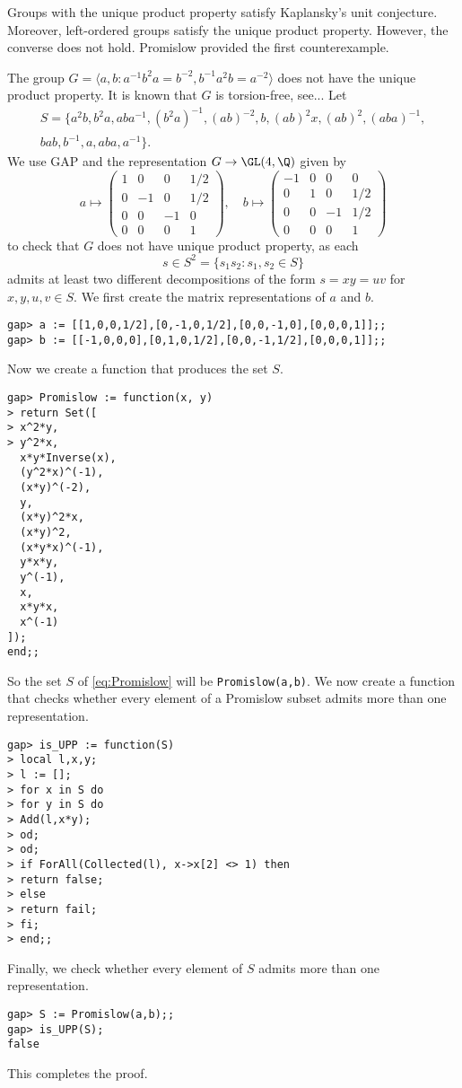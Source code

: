 Groups with the unique product property satisfy 
Kaplansky's unit conjecture. Moreover, 
left-ordered groups satisfy 
the unique product property. However, the converse
does not hold. Promislow provided the first counterexample.

\begin{example}
    The group $G=\langle a,b:a^{-1}b^2a=b^{-2},b^{-1}a^2b=a^{-2}\rangle$
    does not have the unique product property. 
    It is known that $G$ is torsion-free, see... 
    Let 
    \begin{multline}
    \label{eq:Promislow}
    S=\{ a^2b,
    b^2a,
    aba^{-1},
    (b^2a)^{-1},
    (ab)^{-2},
    b,
    (ab)^2x,
    (ab)^2,
    (aba)^{-1},\\
    bab,
    b^{-1},
    a,
    aba,
    a^{-1}
    \}.
    \end{multline}
    We use \textsf{GAP} and the representation $G\to\GL(4,\Q)$ given by 
    \[
a\mapsto\begin{pmatrix}
1 & 0 & 0 & 1/2\\
0 & -1 & 0 & 1/2\\
0 & 0 & -1 & 0\\
0 & 0 & 0 & 1
\end{pmatrix},
\quad
b\mapsto\begin{pmatrix}
-1 & 0 & 0 & 0\\
0 & 1 & 0 & 1/2\\
0 & 0 & -1 & 1/2\\
0 & 0 & 0 & 1
\end{pmatrix}
\]
    to check that 
    $G$ does not have
    unique product property, as each 
    \[
    s\in S^2=\{s_1s_2:s_1,s_2\in S\}
    \]
    admits at least two different decompositions of the 
    form $s=xy=uv$ for $x,y,u,v\in S$. 
    We first create the matrix representations of $a$ and $b$.
\begin{lstlisting}
gap> a := [[1,0,0,1/2],[0,-1,0,1/2],[0,0,-1,0],[0,0,0,1]];;
gap> b := [[-1,0,0,0],[0,1,0,1/2],[0,0,-1,1/2],[0,0,0,1]];;
\end{lstlisting}
    Now we create
    a function that produces the set $S$.
\begin{lstlisting}
gap> Promislow := function(x, y)
> return Set([
> x^2*y,
> y^2*x,
  x*y*Inverse(x),
  (y^2*x)^(-1),
  (x*y)^(-2),
  y,
  (x*y)^2*x,
  (x*y)^2,
  (x*y*x)^(-1),
  y*x*y,
  y^(-1),
  x,
  x*y*x,
  x^(-1)
]);
end;;
\end{lstlisting}
So the set $S$ of \eqref{eq:Promislow} 
will be \lstinline{Promislow(a,b)}. We now
create a function that checks whether
every element of a Promislow subset 
admits more than one representation.
\begin{lstlisting}
gap> is_UPP := function(S)
> local l,x,y;
> l := [];
> for x in S do
> for y in S do
> Add(l,x*y);
> od;
> od;
> if ForAll(Collected(l), x->x[2] <> 1) then
> return false;
> else
> return fail;
> fi;
> end;;
\end{lstlisting}
Finally, we check whether every element of 
$S$ admits more than one representation.
\begin{lstlisting}
gap> S := Promislow(a,b);;
gap> is_UPP(S);
false
\end{lstlisting}
This completes the proof. 
\end{example}
